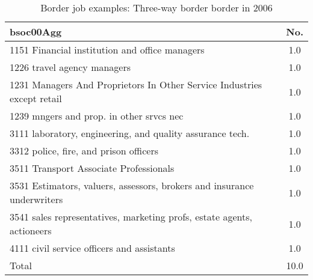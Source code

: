 \begin{table}[h!]
	\centering
	\caption{Border job examples: Three-way border border in 2006}
	\label{tab:3601123mult}
	\begin{tabular}{lc}
	\toprule
bsoc00Agg&No. \\
\hline
1151 Financial institution and office managers&1.0 \\
1226 travel agency managers&1.0 \\
1231 Managers And Proprietors In Other Service Industries except retail&1.0 \\
1239 mngers and prop. in other srvcs nec&1.0 \\
3111 laboratory, engineering, and quality assurance tech.&1.0 \\
3312 police, fire, and prison officers&1.0 \\
3511 Transport Associate Professionals&1.0 \\
3531 Estimators, valuers, assessors, brokers and insurance underwriters&1.0 \\
3541 sales representatives, marketing profs, estate agents, actioneers&1.0 \\
4111 civil service officers and assistants&1.0 \\
Total&10.0 \\
\bottomrule
\bottomrule
\end{tabular}
\end{table}
